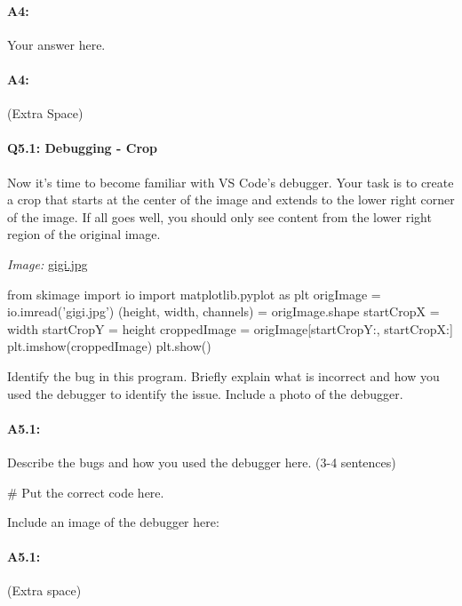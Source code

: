 \documentclass[11pt]{article}
\begin{document}
\paragraph{A4:} Your answer here.

\pagebreak
\paragraph{A4:} (Extra Space)



\pagebreak
\paragraph{Q5.1: Debugging - Crop} Now it's time to become familiar with VS Code's debugger. Your task is to create a crop that starts at the center of the image and extends to the lower right corner of the image. If all goes well, you should only see content from the lower right region of the original image.


\emph{Image:} \href{gigi.jpg}{gigi.jpg}

\begin{python}
from skimage import io
import matplotlib.pyplot as plt
origImage = io.imread('gigi.jpg')
(height, width, channels) = origImage.shape
startCropX = width %
startCropY = height %
croppedImage = origImage[startCropY:, startCropX:]
plt.imshow(croppedImage)
plt.show()
\end{python}
Identify the bug in this program. Briefly explain what is incorrect and how you used the debugger to identify the issue. Include a photo of the debugger.

\paragraph{A5.1: } Describe the bugs and how you used the debugger here. (3-4 sentences)
\begin{python}
# Put the correct code here.
\end{python}

Include an image of the debugger here:

\pagebreak
\paragraph{A5.1:}
(Extra space)
\end{document}
